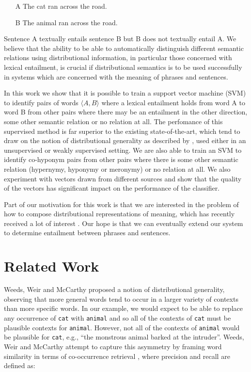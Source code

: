 \documentclass[11pt]{article}
\begin{document}
\begin{itemize}
\item[A]{The cat ran across the road.}
\item[B]{The animal ran across the road.}
\end{itemize}

Sentence A textually entails sentence B but B does not textually entail A.  We believe that the ability to be able to automatically distinguish different semantic relations using distributional information, in particular those concerned with lexical entailment, is crucial if distributional semantics is to be used successfully in systems which are concerned with the meaning of phrases and sentences.

In this work we show that it is possible to train a support vector machine (SVM) to identify pairs of words $\langle A,B\rangle$ where a lexical entailment holds from word A to word B from other pairs where there may be an entailment in the other direction, some other semantic relation or no relation at all.  The perfomance of this supervised method is far superior to the existing state-of-the-art, which tend to draw on the notion of distributional generality as described by \cite{Weeds2004}, used either in an unsupervised or weakly supervised setting.  We are also able to train an SVM to identify co-hyponym pairs from other pairs where there is some other semantic relation (hypernymy, hyponymy or meronymy) or no relation at all.  We also experiment with vectors drawn from different sources and show that the quality of the vectors has significant impact on the performance of the classifier.

Part of our motivation for this work is that we are interested in the
problem of how to compose distributional representations of meaning,
which has recently received a lot of interest
\cite{Widdows:08,Mitchell:08,Baroni2010,Grefenstette:11,Socher:12}. Our
hope is that we can eventually extend our system to determine
entailment between phrases and sentences.

\section{Related Work}

Weeds, Weir and McCarthy  proposed a notion of distributional generality, observing that more general words tend to occur in a larger variety of contexts than more specific words.  In our example, we would expect to be able to replace any occurrence of \texttt{cat} with \texttt{animal} and so all of the contexts of \texttt{cat} must be plausible contexts for \texttt{animal}.  However, not all of the contexts of \texttt{animal} would be plausible for \texttt{cat}, e.g., ``the monstrous animal barked at the intruder''.  Weeds, Weir and McCarthy attempt to capture this asymmetry by framing word similarity in terms of co-occurrence retrieval \cite{Weeds2003}, where precision and recall are defined as:
\end{document}
